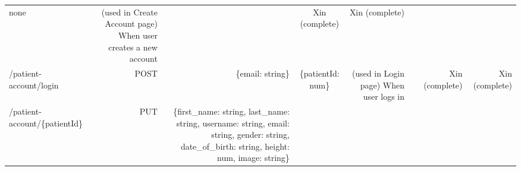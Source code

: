 \documentclass[]{book}
\begin{document}
\begin{longtable}[]{@{}lrrcrrrr@{}}
\begin{minipage}[t]{0.15\columnwidth}
none\strut
\end{minipage} & \begin{minipage}[t]{0.06\columnwidth}\raggedleft
(used in Create Account page) When user creates a new account\strut
\end{minipage} & \begin{minipage}[t]{0.06\columnwidth}\raggedleft
\strut
\end{minipage} & \begin{minipage}[t]{0.06\columnwidth}\raggedleft
Xin (complete)\strut
\end{minipage} & \begin{minipage}[t]{0.06\columnwidth}\raggedleft
Xin (complete)\strut
\end{minipage}\tabularnewline
\begin{minipage}[t]{0.13\columnwidth}\raggedright
/patient-account/login\strut
\end{minipage} & \begin{minipage}[t]{0.14\columnwidth}\raggedleft
POST\strut
\end{minipage} & \begin{minipage}[t]{0.14\columnwidth}\raggedleft
\{email: string\}\strut
\end{minipage} & \begin{minipage}[t]{0.15\columnwidth}\centering
\{patientId: num\}\strut
\end{minipage} & \begin{minipage}[t]{0.06\columnwidth}\raggedleft
(used in Login page) When user logs in\strut
\end{minipage} & \begin{minipage}[t]{0.06\columnwidth}\raggedleft
\strut
\end{minipage} & \begin{minipage}[t]{0.06\columnwidth}\raggedleft
Xin (complete)\strut
\end{minipage} & \begin{minipage}[t]{0.06\columnwidth}\raggedleft
Xin (complete)\strut
\end{minipage}\tabularnewline
\begin{minipage}[t]{0.13\columnwidth}\raggedright
/patient-account/\{patientId\}\strut
\end{minipage} & \begin{minipage}[t]{0.14\columnwidth}\raggedleft
PUT\strut
\end{minipage} & \begin{minipage}[t]{0.14\columnwidth}\raggedleft
\{first\_name: string, last\_name: string, username: string, email: string, gender: string, date\_of\_birth: string, height: num, image: string\}\strut

\end{minipage}
\end{longtable}
\end{document}
